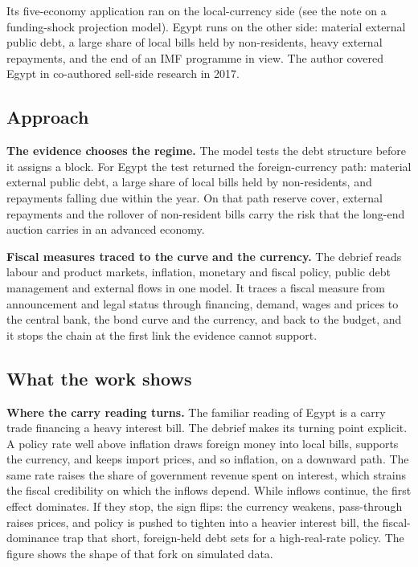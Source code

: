 \documentclass[
  british,
  a4paper,
]{article}
\begin{document}
Its five-economy application ran on the local-currency side (see the
note on a funding-shock projection model). Egypt runs on the other side:
material external public debt, a large share of local bills held by
non-residents, heavy external repayments, and the end of an IMF
programme in view. The author covered Egypt in co-authored sell-side
research in 2017.

\subsection{Approach}\label{approach}

\textbf{The evidence chooses the regime.} The model tests the debt
structure before it assigns a block. For Egypt the test returned the
foreign-currency path: material external public debt, a large share of
local bills held by non-residents, and repayments falling due within the
year. On that path reserve cover, external repayments and the rollover
of non-resident bills carry the risk that the long-end auction carries
in an advanced economy.

\textbf{Fiscal measures traced to the curve and the currency.} The
debrief reads labour and product markets, inflation, monetary and fiscal
policy, public debt management and external flows in one model. It
traces a fiscal measure from announcement and legal status through
financing, demand, wages and prices to the central bank, the bond curve
and the currency, and back to the budget, and it stops the chain at the
first link the evidence cannot support.

\subsection{What the work shows}\label{what-the-work-shows}

\textbf{Where the carry reading turns.} The familiar reading of Egypt is
a carry trade financing a heavy interest bill. The debrief makes its
turning point explicit. A policy rate well above inflation draws foreign
money into local bills, supports the currency, and keeps import prices,
and so inflation, on a downward path. The same rate raises the share of
government revenue spent on interest, which strains the fiscal
credibility on which the inflows depend. While inflows continue, the
first effect dominates. If they stop, the sign flips: the currency
weakens, pass-through raises prices, and policy is pushed to tighten
into a heavier interest bill, the fiscal-dominance trap that short,
foreign-held debt sets for a high-real-rate policy. The figure shows the
shape of that fork on simulated data.
\end{document}
